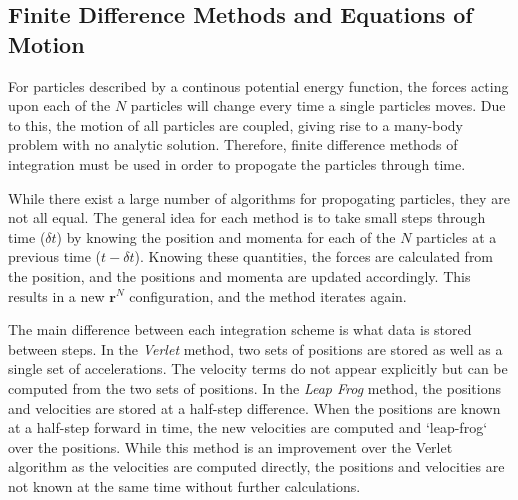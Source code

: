 \subsection{Finite Difference Methods and Equations of Motion}
For particles described by a continous potential energy function, the
forces acting upon each of the $N$ particles will change every time a
single particles moves. Due to this, the motion of all particles are
coupled, giving rise to a many-body problem with no analytic
solution. Therefore, finite difference methods of integration must be
used in order to propogate the particles through time.

While there exist a large number of algorithms for propogating
particles, they are not all equal. The general idea for each method is
to take small steps through time ($\delta t$) by knowing the position
and momenta for each of the $N$ particles at a previous time
($t-\delta t$). Knowing these quantities, the forces are calculated
from the position, and the positions and momenta are updated
accordingly. This results in a new $\mathbf{r}^N$ configuration, and
the method iterates again.

The main difference between each integration scheme is what data is
stored between steps. In the \textit{Verlet} method, two sets of
positions are stored as well as a single set of accelerations. The
velocity terms do not appear explicitly but can be computed from the
two sets of positions. In the \textit{Leap Frog} method, the positions
and velocities are stored at a half-step difference. When the
positions are known at a half-step forward in time, the new velocities are
computed and `leap-frog` over the positions. While this method is an
improvement over the Verlet algorithm as the velocities are computed
directly, the positions and velocities are not known at the same time
without further calculations.

